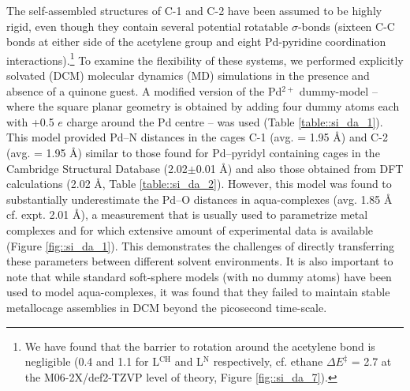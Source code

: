 \documentclass[../../main.tex]{subfiles}
\begin{document}
The self-assembled structures of C-1 and C-2 have been assumed to be highly rigid, even though they contain several potential rotatable $\sigma$-bonds (sixteen C-C bonds at either side of the acetylene group and eight Pd-pyridine coordination interactions).\footnote{We have found that the barrier to rotation around the acetylene bond is negligible (0.4 and 1.1 \kcalx for L${}^\text{CH}$ and L${}^\text{N}$ respectively, cf. ethane $\Delta E^\ddagger$ = 2.7 \kcalx at the M06-2X/def2-TZVP level of theory, Figure \ref{fig::si_da_7}).} To examine the flexibility of these systems, we performed explicitly solvated (DCM) molecular dynamics (MD) simulations in the presence and absence of a quinone guest. A modified version of the Pd${}^{2+}$ dummy-model – where the square planar geometry is obtained by adding four dummy atoms each with +0.5 $e$ charge around the Pd centre – was used (Table \ref{table::si_da_1}).\cite{Duarte2014} This model provided Pd–N distances in the cages C-1 (avg. = 1.95 \AA) and C-2 (avg. = 1.95 \AA) similar to those found for Pd–pyridyl containing cages in the Cambridge Structural Database (2.02$\pm$0.01 \AA)\cite{Lewis2012, August2016} and also those obtained from DFT calculations (2.02 \AA, Table \ref{table::si_da_2}). However, this model was found to substantially underestimate the Pd–O distances in aqua-complexes (avg. 1.85 \AA$\;$ cf. expt.\cite{Persson2010} 2.01 \AA), a measurement that is usually used to parametrize metal complexes and for which extensive amount of experimental data is available (Figure \ref{fig::si_da_1}).\cite{Li2017} This demonstrates the challenges of directly transferring these parameters between different solvent environments. It is also important to note that while standard soft-sphere models (with no dummy atoms) have been used to model aqua-complexes, it was found that they failed to maintain stable metallocage assemblies in DCM beyond the picosecond time-scale. 
\end{document}
